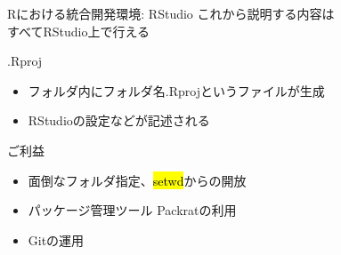 \documentclass[ignorenonframetext,]{beamer}
\begin{document}
\begin{frame}{Rにおける統合開発環境: RStudio}
\large{\faHandLeft これから説明する内容は\\すべてRStudio上で行える}

\end{frame}

\begin{frame}


\end{frame}

\begin{frame}


\end{frame}

\begin{frame}{.Rproj}

\begin{itemize}
\itemsep1pt\parskip0pt
\item
  フォルダ内にフォルダ名.Rprojというファイルが生成
\item
  RStudioの設定などが記述される
\end{itemize}

\begin{block}{ご利益}

\begin{itemize}
\itemsep1pt\parskip0pt
\item
  面倒なフォルダ指定、\hl{setwd}からの開放
\item
  パッケージ管理ツール Packratの利用
\item
  Gitの運用
\end{itemize}

\end{block}

\end{frame}
\end{document}
